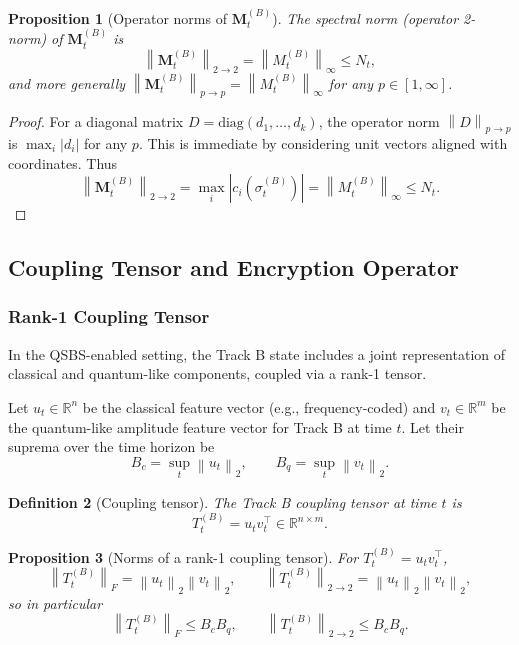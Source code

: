 \documentclass[11pt]{article}
\newtheorem{definition}{Definition}[section]
\newtheorem{proposition}[definition]{Proposition}
\newcommand{\R}{\mathbb{R}}
\newcommand{\norm}[1]{\left\lVert #1 \right\rVert}
\newcommand{\abs}[1]{\left\lvert #1 \right\rvert}
\begin{document}
\begin{proposition}[Operator norms of \(\mathbf{M}_t^{(B)}\)]
The spectral norm (operator 2-norm) of \(\mathbf{M}_t^{(B)}\) is
\[
  \norm{\mathbf{M}_t^{(B)}}_{2\to2} = \norm{M_t^{(B)}}_\infty \le N_t,
\]
and more generally \(\norm{\mathbf{M}_t^{(B)}}_{p\to p} = \norm{M_t^{(B)}}_\infty\) for any \(p \in [1,\infty]\).
\end{proposition}

\begin{proof}
For a diagonal matrix \(D = \mathrm{diag}(d_1,\dots,d_k)\), the operator norm \(\norm{D}_{p\to p}\) is \(\max_i \abs{d_i}\) for any \(p\).
This is immediate by considering unit vectors aligned with coordinates.
Thus
\[
  \norm{\mathbf{M}_t^{(B)}}_{2\to2} = \max_i \abs{c_i(\sigma_t^{(B)})} = \norm{M_t^{(B)}}_\infty \le N_t.
\]
\end{proof}

\subsection{Coupling Tensor and Encryption Operator}

\subsubsection{Rank-1 Coupling Tensor}

In the QSBS-enabled setting, the Track B state includes a joint representation of classical and quantum-like components, coupled via a rank-1 tensor.

Let \(u_t \in \R^n\) be the classical feature vector (e.g., frequency-coded) and \(v_t \in \R^m\) be the quantum-like amplitude feature vector for Track B at time \(t\).
Let their suprema over the time horizon be
\[
  B_c = \sup_t \norm{u_t}_2, \qquad
  B_q = \sup_t \norm{v_t}_2.
\]

\begin{definition}[Coupling tensor]
The Track B coupling tensor at time \(t\) is
\[
  T_t^{(B)} = u_t v_t^\top \in \R^{n \times m}.
\]
\end{definition}

\begin{proposition}[Norms of a rank-1 coupling tensor]
For \(T_t^{(B)} = u_t v_t^\top\),
\[
  \norm{T_t^{(B)}}_F = \norm{u_t}_2 \norm{v_t}_2, \qquad
  \norm{T_t^{(B)}}_{2\to2} = \norm{u_t}_2 \norm{v_t}_2,
\]
so in particular
\[
  \norm{T_t^{(B)}}_F \le B_c B_q, \qquad
  \norm{T_t^{(B)}}_{2\to2} \le B_c B_q.
\]
\end{proposition}
\end{document}
